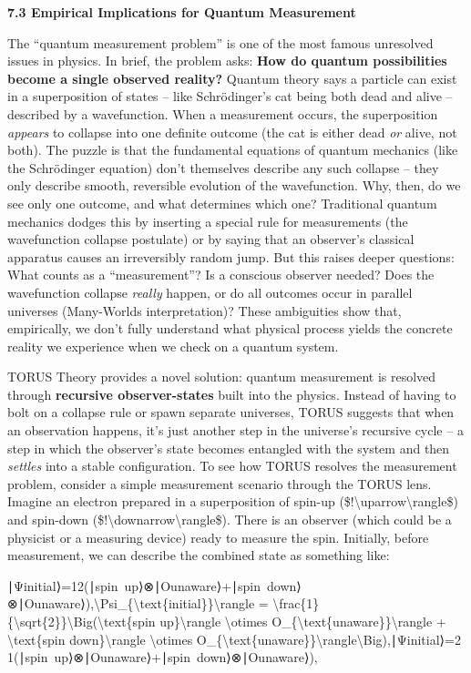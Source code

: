 \textbf{7.3 Empirical Implications for Quantum Measurement}

The ``quantum measurement problem'' is one of the most famous unresolved
issues in physics. In brief, the problem asks: \textbf{How do quantum
possibilities become a single observed reality?} Quantum theory says a
particle can exist in a superposition of states -- like Schrödinger's
cat being both dead and alive -- described by a wavefunction. When a
measurement occurs, the superposition \emph{appears} to collapse into
one definite outcome (the cat is either dead \emph{or} alive, not both).
The puzzle is that the fundamental equations of quantum mechanics (like
the Schrödinger equation) don't themselves describe any such collapse --
they only describe smooth, reversible evolution of the wavefunction.
Why, then, do we see only one outcome, and what determines which one?
Traditional quantum mechanics dodges this by inserting a special rule
for measurements (the wavefunction collapse postulate) or by saying that
an observer's classical apparatus causes an irreversibly random jump.
But this raises deeper questions: What counts as a ``measurement''? Is a
conscious observer needed? Does the wavefunction collapse \emph{really}
happen, or do all outcomes occur in parallel universes (Many-Worlds
interpretation)? These ambiguities show that, empirically, we don't
fully understand what physical process yields the concrete reality we
experience when we check on a quantum system.

TORUS Theory provides a novel solution: quantum measurement is resolved
through \textbf{recursive observer-states} built into the physics.
Instead of having to bolt on a collapse rule or spawn separate
universes, TORUS suggests that when an observation happens, it's just
another step in the universe's recursive cycle -- a step in which the
observer's state becomes entangled with the system and then
\emph{settles} into a stable configuration. To see how TORUS resolves
the measurement problem, consider a simple measurement scenario through
the TORUS lens. Imagine an electron prepared in a superposition of
spin-up (\$\textbar{}!\textbackslash{}uparrow\textbackslash{}rangle\$)
and spin-down
(\$\textbar{}!\textbackslash{}downarrow\textbackslash{}rangle\$). There
is an observer (which could be a physicist or a measuring device) ready
to measure the spin. Initially, before measurement, we can describe the
combined state as something like:

∣Ψinitial⟩=12(∣spin~up⟩⊗∣Ounaware⟩+∣spin~down⟩⊗∣Ounaware⟩),\textbar{}\textbackslash{}Psi\_\{\textbackslash{}text\{initial\}\}\textbackslash{}rangle
=
\textbackslash{}frac\{1\}\{\textbackslash{}sqrt\{2\}\}\textbackslash{}Big(\textbar{}\textbackslash{}text\{spin
up\}\textbackslash{}rangle \textbackslash{}otimes
\textbar{}O\_\{\textbackslash{}text\{unaware\}\}\textbackslash{}rangle +
\textbar{}\textbackslash{}text\{spin down\}\textbackslash{}rangle
\textbackslash{}otimes
\textbar{}O\_\{\textbackslash{}text\{unaware\}\}\textbackslash{}rangle\textbackslash{}Big),∣Ψinitial​⟩=2​1​(∣spin~up⟩⊗∣Ounaware​⟩+∣spin~down⟩⊗∣Ounaware​⟩),


